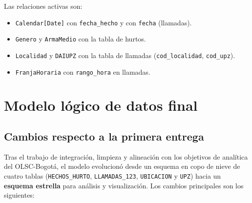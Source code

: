\documentclass[12pt,letterpaper]{article}
\begin{document}
Las relaciones activas son:
\begin{itemize}[noitemsep, topsep=0pt]
    \item \texttt{Calendar[Date]} con \texttt{fecha\_hecho} y con \texttt{fecha} (llamadas).
    \item \texttt{Genero} y \texttt{ArmaMedio} con la tabla de hurtos.
    \item \texttt{Localidad} y \texttt{DAIUPZ} con la tabla de llamadas (\texttt{cod\_localidad}, \texttt{cod\_upz}).
    \item \texttt{FranjaHoraria} con \texttt{rango\_hora} en llamadas.
\end{itemize}

\section{Modelo lógico de datos final}

\subsection{Cambios respecto a la primera entrega}

Tras el trabajo de integración, limpieza y alineación con los objetivos de analítica del OLSC-Bogotá, el modelo evolucionó desde un esquema en copo de nieve de cuatro tablas (\texttt{HECHOS\_HURTO}, \texttt{LLAMADAS\_123}, \texttt{UBICACION} y \texttt{UPZ}) hacia un \textbf{esquema estrella} para análisis y visualización. Los cambios principales son los siguientes:
\end{document}
